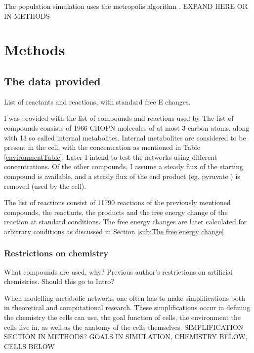 \documentclass[10pt,a4paper]{article}
\begin{document}
	The population simulation uses the metropolis algorithm \cite{metropolisalgorithm}. EXPAND HERE OR IN METHODS


	
\section{Methods}
\label{sec:methods}

\subsection{The data provided}
\label{sub:What was I provided with?}
List of reactants and reactions, with standard free E changes. 



	
	I was provided with the list of compounds and reactions used by \citeauthor{BartekLower} The list of compounds consists of 1966 CHOPN molecules of at most 3 carbon atoms, along with 13 so called internal metabolites. Internal metabolites are considered to be present in the cell, with the concentration as mentioned in Table \ref{environmentTable}. Later I intend to test the networks using different concentrations. Of the other compounds, I assume a steady flux of the starting compound is available, and a steady flux of the end product (eg. pyruvate ) is removed (used by the cell). 
	
	The list of reactions consist of 11790 reactions of the previously mentioned compounds, the reactants, the products and the free energy change of the reaction at standard conditions. The free energy changes are later calculated for arbitrary conditions as discussed in Section \ref{sub:The free energy change}
	
\subsubsection{Restrictions on chemistry}
\label{ssub:Restrictions on chemistry}
What compounds are used, why?
Previous author's restrictions on artificial chemistries. Should this go to Intro?



	When modelling metabolic networks one often has to make simplifications both in theoretical and computational research. These simplifications occur in defining the chemistry the cells can use, the goal function of cells, the environment the cells live in, as well as the anatomy of the cells themselves. SIMPLIFICATION SECTION IN METHODS? GOALS IN SIMULATION, CHEMISTRY BELOW, CELLS BELOW
	
\end{document}
